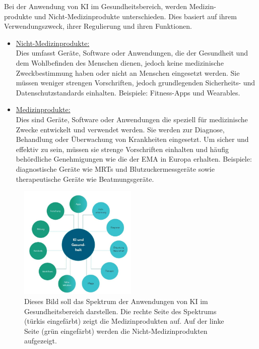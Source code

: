 \documentclass{report}
\begin{document}

Bei der Anwendung von KI im Gesundheitsbereich, werden Medizin-\\produkte und Nicht-Medizinprodukte 
unterschieden. Dies basiert auf ihrem Verwendungszweck, ihrer Regulierung und ihren Funktionen.

\begin{itemize}
\item \underline{Nicht-Medizinprodukte:}\\ Dies umfasst Geräte, Software oder Anwendungen, die 
der Gesundheit und dem Wohlbefinden des Menschen dienen, jedoch keine medizinische Zweckbestimmung haben oder nicht an Menschen 
eingesetzt werden. Sie müssen weniger strengen Vorschriften, jedoch grundlegenden Sicherheits- und Datenschutzstandards
einhalten. Beispiele: Fitness-Apps und Wearables.
\item \underline{Medizinprodukte:} \\Dies sind Geräte, Software oder Anwendungen die speziell für medizinische Zwecke 
entwickelt und verwendet werden. Sie werden zur Diagnose, Behandlung oder Überwachung von Krankheiten eingesetzt.
Um sicher und effektiv zu sein, müssen sie strenge Vorschriften einhalten und häufig behördliche Genehmigungen wie die der EMA 
in Europa erhalten. Beispiele: diagnostische Geräte wie MRTs und Blutzuckermessgeräte sowie therapeutische Geräte
wie Beatmungsgeräte.
\end{itemize}

\begin{figure}[H]
    \centering
    \includegraphics[width=0.50\textwidth]{Bild13.jpg}
    \caption{Dieses Bild soll das Spektrum der Anwendungen von KI im Gesundheitsbereich darstellen. Die rechte Seite des Spektrums (türkis eingefärbt)
    zeigt die Medizinprodukten auf. Auf der linke Seite (grün eingefärbt) werden die Nicht-Medizinprodukten aufgezeigt.}

    \label{fig:Bildmedizin}
\end{figure}
\end{document}
